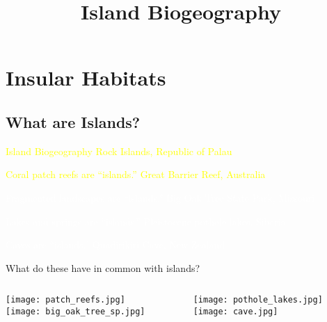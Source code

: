 \documentclass[xcolor=svgnames]{beamer}
\title{Island Biogeography}
\begin{document}
\section{Insular Habitats}
\subsection{What are Islands?}

{
\begin{frame}[b]{\textcolor{yellow} {Island Biogeography}}
	\hfill \textcolor{yellow}{Rock Islands, Republic of Palau}
\end{frame}
}

{
\begin{frame}[b]{\textcolor{yellow} {Coral patch reefs are ``islands.''}}
	\hfill \textcolor{yellow}{Great Barrier Reef, Australia}
\end{frame}
}

{
\begin{frame}[b]{\textcolor{white} {Fragmented landscapes are ``islands.''}}
	\hfill \textcolor{white}{Big Oak Tree State Park, Missouri}
\end{frame}
}

{
\begin{frame}[b]{\textcolor{white} {Lakes and springs are ``islands.''}}
	\hfill \textcolor{white}{Pleistocene pothole lakes, Siberia}
\end{frame}
}

{
\begin{frame}[b]{\textcolor{white} {Caves are ``islands.''}}
	\hfill \textcolor{white}{Quadirikiri Cave, New Zealand}
\end{frame}
}

\begin{frame}{What do these have in common with islands?}
	\begin{columns}[T]
		\begin{column}{0.5\textwidth}
			\centering
			\texttt{[image: patch\_reefs.jpg]}\\
			\texttt{[image: big\_oak\_tree\_sp.jpg]}
		\end{column}
		\begin{column}{0.5\textwidth}
			\centering
			\texttt{[image: pothole\_lakes.jpg]}\\
			\texttt{[image: cave.jpg]}
		\end{column}	
	\end{columns}
\end{frame}
\end{document}
